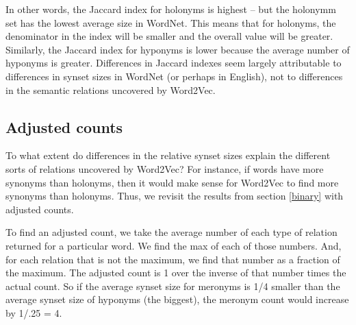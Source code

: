 \documentclass{article}
\begin{document}
In other words, the Jaccard index for holonyms is highest -- but the holonymm set has the lowest average size in WordNet. This means that for holonyms, the denominator in the index will be smaller and the overall value will be greater. Similarly, the Jaccard index for hyponyms is lower because the average number of hyponyms is greater. Differences in Jaccard indexes seem largely attributable to differences in synset sizes in WordNet (or perhaps in English), not to differences in the semantic relations uncovered by Word2Vec.

\subsection{Adjusted counts}
To what extent do differences in the relative synset sizes explain the different sorts of relations uncovered by Word2Vec? For instance, if words have more synonyms than holonyms, then it would make sense for Word2Vec to find more synonyms than holonyms. Thus, we revisit the results from section \ref{binary} with adjusted counts.

To find an adjusted count, we take the average number of each type of relation returned for a particular word. We find the max of each of those numbers. And, for each relation that is not the maximum, we find that number as a fraction of the maximum. The adjusted count is 1 over the inverse of that number times the actual count. So if the average synset size for meronyms is 1/4 smaller than the average synset size of hyponyms (the biggest), the meronym count would increase by 1/.25 = 4.
\end{document}
